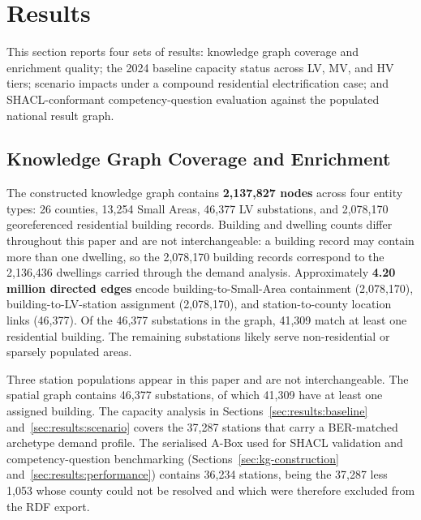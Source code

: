 \documentclass[preprint,12pt]{elsarticle}
\begin{document}
\section{Results}
\label{sec:result}

This section reports four sets of results: knowledge graph coverage and
enrichment quality; the 2024 baseline capacity status across LV, MV, and
HV tiers; scenario impacts under a compound residential electrification
case; and SHACL-conformant competency-question evaluation against the
populated national result graph.

\subsection{Knowledge Graph Coverage and Enrichment}
\label{sec:results:kg}

The constructed knowledge graph contains \textbf{2,137,827 nodes} across
four entity types: 26 counties, 13,254 Small Areas, 46,377 LV substations,
and 2,078,170 georeferenced residential building records.
Building and dwelling counts differ throughout this paper and are not
interchangeable: a building record may contain more than one dwelling, so the
2,078,170 building records correspond to the 2,136,436 dwellings carried
through the demand analysis.
Approximately \textbf{4.20 million directed edges} encode
building-to-Small-Area containment (2,078,170), building-to-LV-station
assignment (2,078,170), and station-to-county location links (46,377).
Of the 46,377 substations in the graph, 41,309 match at least one
residential building.
The remaining substations likely serve non-residential or sparsely populated
areas.

Three station populations appear in this paper and are not
interchangeable. The spatial graph contains 46,377 substations, of which
41,309 have at least one assigned building. The capacity analysis in
Sections~\ref{sec:results:baseline} and~\ref{sec:results:scenario} covers
the 37,287 stations that carry a BER-matched archetype demand profile.
The serialised A-Box used for SHACL validation and
competency-question benchmarking
(Sections~\ref{sec:kg-construction} and~\ref{sec:results:performance})
contains 36,234 stations, being the 37,287 less 1,053 whose county could
not be resolved and which were therefore excluded from the RDF export.
\end{document}
